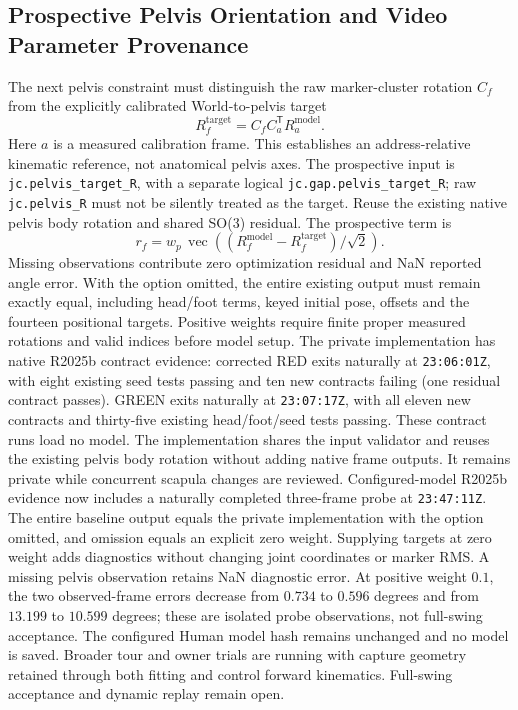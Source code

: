 \documentclass[11pt,a4paper]{article}
\begin{document}
\subsection{Prospective Pelvis Orientation and Video Parameter Provenance}
The next pelvis constraint must distinguish the raw marker-cluster rotation
$C_f$ from the explicitly calibrated World-to-pelvis target
\[
 R^{\mathrm{target}}_f=C_fC_a^{\mathsf T}R^{\mathrm{model}}_a.
\]
Here $a$ is a measured calibration frame. This establishes an
address-relative kinematic reference, not anatomical pelvis axes. The
prospective input is \texttt{jc.pelvis\_target\_R}, with a separate logical
\texttt{jc.gap.pelvis\_target\_R}; raw \texttt{jc.pelvis\_R} must not be
silently treated as the target. Reuse the existing native pelvis body
rotation and shared SO(3) residual. The prospective term is
\[
 r_f=w_p\,\operatorname{vec}\!\left(
       (R^{\mathrm{model}}_f-R^{\mathrm{target}}_f)/\sqrt{2}\right).
\]
Missing observations contribute zero optimization residual and NaN
reported angle error. With the option omitted, the entire existing
output must remain exactly equal, including head/foot terms, keyed
initial pose, offsets and the fourteen positional targets. Positive
weights require finite proper measured rotations and valid indices before
model setup. The private implementation has native R2025b contract evidence: corrected
RED exits naturally at \texttt{23:06:01Z}, with eight existing seed tests
passing and ten new contracts failing (one residual contract passes).
GREEN exits naturally at \texttt{23:07:17Z}, with all eleven new contracts
and thirty-five existing head/foot/seed tests passing. These contract runs
load no model. The implementation shares the input validator and reuses
the existing pelvis body rotation without adding native frame outputs.
It remains private while concurrent scapula changes are reviewed.
Configured-model R2025b evidence now includes a naturally completed
three-frame probe at \texttt{23:47:11Z}. The entire baseline output equals
the private implementation with the option omitted, and omission equals
an explicit zero weight. Supplying targets at zero weight adds diagnostics
without changing joint coordinates or marker RMS. A missing pelvis
observation retains NaN diagnostic error. At positive weight $0.1$, the
two observed-frame errors decrease from $0.734$ to $0.596$ degrees and
from $13.199$ to $10.599$ degrees; these are isolated probe observations,
not full-swing acceptance. The configured Human model hash remains
unchanged and no model is saved. Broader tour and owner trials are
running with capture geometry retained through both fitting and control
forward kinematics. Full-swing acceptance and dynamic replay remain open.
\end{document}
